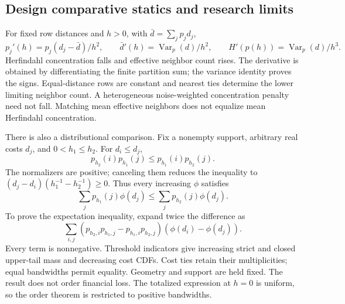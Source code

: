 \documentclass[11pt]{article}
\renewcommand{\lean}[1]{\ignorespaces}
\renewcommand{\leanok}{\ignorespaces}
\begin{document}
\subsection{Design comparative statics and research
limits}\label{app:comparatives}
For fixed row distances and $h>0$, with $\bar d=\sum_j p_j d_j$,
\[
  p_j'(h)=p_j(d_j-\bar d)/h^2,\qquad
  \bar d'(h)=\operatorname{Var}_p(d)/h^2,\qquad
  H'(p(h))=\operatorname{Var}_p(d)/h^3.
\]
\lean{FreeFoundations.Bandwidth.hasDerivAt_expRow,
  FreeFoundations.Bandwidth.hasDerivAt_meanDistance,
FreeFoundations.Bandwidth.hasDerivAt_entropy}\leanok{}
Herfindahl concentration falls and effective neighbor count rises.
The derivative is obtained by differentiating the finite partition sum; the
variance identity proves the signs. Equal-distance rows are constant and
nearest ties determine the lower limiting neighbor count. A heterogeneous
noise-weighted concentration penalty need not fall. Matching mean effective
neighbors does not equalize mean Herfindahl concentration.

There is also a distributional comparison. Fix a nonempty support, arbitrary
real costs $d_j$, and $0<h_1\le h_2$. For $d_i\le d_j$,
\[
  p_{h_2}(i)p_{h_1}(j)\le p_{h_1}(i)p_{h_2}(j).
\]
The normalizers are positive; canceling them reduces the inequality to
$(d_j-d_i)(h_1^{-1}-h_2^{-1})\ge0$. Thus every increasing $\phi$ satisfies
\[
  \sum_j p_{h_1}(j)\phi(d_j)\le\sum_j p_{h_2}(j)\phi(d_j).
\]
\lean{FreeFoundations.Bandwidth.likelihoodRatio_cross_le,
  FreeFoundations.Bandwidth.monotone_cost_expectation,
FreeFoundations.FiniteProbability.exponentialLaw_expect_monotone}\leanok{}
To prove the expectation inequality, expand twice the difference as
\[
  \sum_{i,j}(p_{h_2,i}p_{h_1,j}-p_{h_1,i}p_{h_2,j})
  (\phi(d_i)-\phi(d_j)).
\]
Every term is nonnegative. Threshold indicators
give increasing strict and closed upper-tail mass and decreasing cost CDFs.
\lean{FreeFoundations.Bandwidth.upperTail_monotoneOn,
  FreeFoundations.Bandwidth.closedUpperTail_monotoneOn,
FreeFoundations.Bandwidth.cdf_antitoneOn}\leanok{}
Cost ties retain their multiplicities; equal bandwidths permit equality.
Geometry and support are held fixed. The result does not order financial loss.
The totalized expression at $h=0$ is uniform, so the order theorem is restricted
to positive bandwidths.
\end{document}
